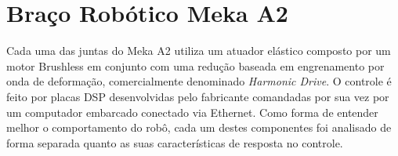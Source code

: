 








\section{Braço Robótico Meka A2}

Cada uma das juntas do Meka A2 utiliza um atuador elástico composto por um motor Brushless em conjunto com uma redução baseada em engrenamento por onda de deformação, comercialmente denominado \textit{Harmonic Drive}. O controle é feito por placas DSP desenvolvidas pelo fabricante comandadas por sua vez por um computador embarcado conectado via Ethernet. Como forma de entender melhor o comportamento do robô, cada um destes componentes foi analisado de forma separada quanto as suas características de resposta no controle.

